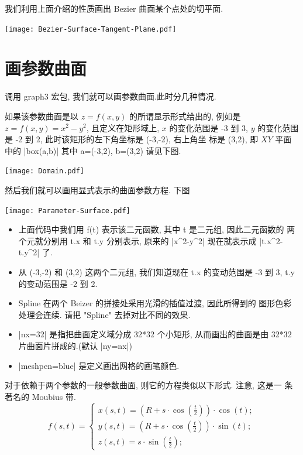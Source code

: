 \documentclass{ctexbook}
\begin{document}
我们利用上面介绍的性质画出 Bezier 曲面某个点处的切平面.
\begin{center}\texttt{[image: Bezier-Surface-Tangent-Plane.pdf]}\end{center}%


\section{画参数曲面}
调用 graph3 宏包, 我们就可以画参数曲面.此时分几种情况.

如果该参数曲面是以 $z=f(x,y)$ 的所谓显示形式给出的, 例如是
$z=f(x,y)=x^2-y^2$, 且定义在矩形域上, $x$ 的变化范围是 -3 到 3,
$y$ 的变化范围是 -2 到 2, 此时该矩形的左下角坐标是 (-3,-2), 右上角坐
标是 (3,2), 即 $XY$ 平面中的 |box(a,b)| 其中 a=(-3,2), b=(3,2) 请见下图.
\begin{center}\texttt{[image: Domain.pdf]}\end{center}%

然后我们就可以画用显式表示的曲面参数方程. 下图
\begin{center}\texttt{[image: Parameter-Surface.pdf]}\end{center}%

\begin{itemize}
\item 上面代码中我们用 f(t) 表示该二元函数, 其中 t 是二元组, 因此二元函数的
  两个元就分别用 t.x 和 t.y 分别表示, 原来的 |x^2-y^2| 现在就表示成
  |t.x^2-t.y^2| 了.
\item 从 (-3,-2) 和 (3,2) 这两个二元组, 我们知道现在 t.x 的变动范围是
  -3 到 3, t.y 的变动范围是 -2 到 2.
\item Spline  在两个 Beizer 的拼接处采用光滑的插值过渡, 因此所得到的
  图形色彩处理会连续. 请把 "Spline" 去掉对比不同的效果.
\item |nx=32| 是指把曲面定义域分成 32*32 个小矩形, 从而画出的曲面是由
  32*32 片曲面片拼成的.(默认 |ny=nx|)
\item |meshpen=blue| 是定义画出网格的画笔颜色.
\end{itemize}
对于依赖于两个参数的一般参数曲面, 则它的方程类似以下形式. 注意, 这是一
条著名的 Moubius 带.
\begin{equation}
  f(s,t)=\left\{
    \begin{array}{ll}
      x(s,t)=(R+s\cdot\cos(\frac{t}{2}))\cdot\cos(t);\\
      y(s,t)=(R+s\cdot\cos(\frac{t}{2}))\cdot\sin(t);\\
      z(s,t)=s\cdot\sin(\frac{t}{2});
    \end{array}\right.
\end{equation}
\end{document}
